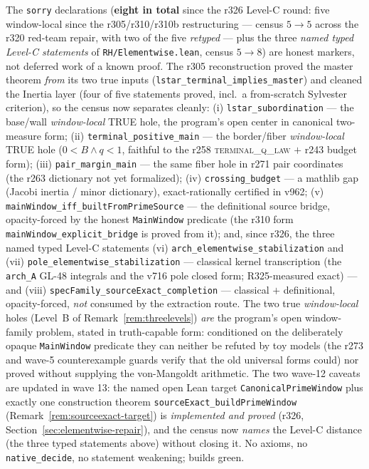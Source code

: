 \documentclass[11pt]{article}
\theoremstyle{definition}
\theoremstyle{remark}
\begin{document}
\noindent The \texttt{sorry} declarations (\textbf{eight in total}
since the r326 Level-C round: five window-local since the
r305/r310/r310b restructuring --- census $5 \to 5$ across the r320
red-team repair, with two of the five \emph{retyped} --- plus the
three \emph{named typed Level-C statements} of
\texttt{RH/Elementwise.lean}, census $5 \to 8$) are honest
markers, not deferred work of a known proof.  The r305
reconstruction proved the master theorem \emph{from} its two true
inputs (\texttt{lstar\_terminal\_implies\_master}) and cleaned the
Inertia layer (four of five statements proved, incl.\ a
from-scratch Sylvester criterion), so the census now separates
cleanly: (i) \texttt{lstar\_subordination} --- the base/wall
\emph{window-local} TRUE hole, the program's open center in
canonical two-measure form;
(ii) \texttt{terminal\_positive\_main} --- the border/fiber
\emph{window-local} TRUE hole ($0<B \wedge q<1$, faithful to the r258
\textsc{terminal\_q\_law} $+$ r243 budget form); (iii)
\texttt{pair\_margin\_main} --- the same fiber hole in r271 pair
coordinates (the r263 dictionary not yet formalized); (iv)
\texttt{crossing\_budget} --- a mathlib gap (Jacobi inertia /
minor dictionary), exact-rationally certified in v962; (v)
\texttt{mainWindow\_iff\_builtFromPrimeSource} --- the definitional
source bridge, opacity-forced by the honest \texttt{MainWindow}
predicate (the r310 form \texttt{mainWindow\_explicit\_bridge} is
proved from it); and, since r326, the three named typed Level-C
statements (vi) \texttt{arch\_elementwise\_stabilization} and (vii)
\texttt{pole\_elementwise\_stabilization} --- classical kernel
transcription (the \texttt{arch\_A} GL-48 integrals and the v716
pole closed form; R325-measured exact) --- and (viii)
\texttt{specFamily\_sourceExact\_completion} --- classical $+$
definitional, opacity-forced, \emph{not} consumed by the extraction
route.  The two true \emph{window-local} holes (Level~B
of Remark~\ref{rem:threelevels}) \emph{are} the program's open
window-family problem, stated in truth-capable form: conditioned on
the deliberately opaque \texttt{MainWindow} predicate they can
neither be refuted by toy models (the r273 and wave-5
counterexample guards verify that the old universal forms could)
nor proved without supplying the von-Mangoldt arithmetic.  The two
wave-12 caveats are updated in wave 13: the named open Lean target
\texttt{CanonicalPrimeWindow} plus exactly one construction theorem
\texttt{sourceExact\_buildPrimeWindow}
(Remark~\ref{rem:sourceexact-target}) is \emph{implemented and
proved} (r326, Section~\ref{sec:elementwise-repair}), and the
census now \emph{names} the Level-C distance (the three typed
statements above) without closing it.  No axioms, no
\texttt{native\_decide}, no statement weakening; builds green.
\end{document}
